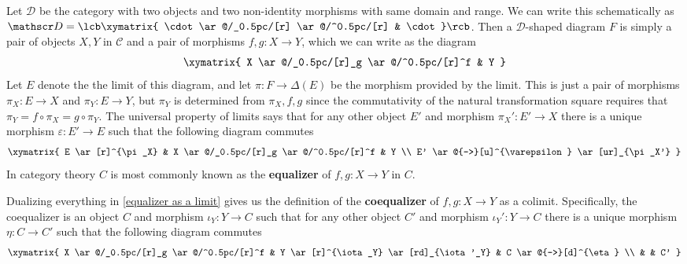 \begin{example}[Equalizers]
\label{equalizer as a limit}
Let $\mathscr D$ be the category with two objects and two non-identity morphisms with same domain and range. We can write this schematically as $\mathscr D = \lcb \xymatrix{ \cdot \ar@/_0.5pc/[r] \ar@/^0.5pc/[r] & \cdot } \rcb$. Then a $\mathscr D$-shaped diagram $F$ is simply a pair of objects $X,Y$ in $\mathscr C$ and a pair of morphisms $f,g : X \rightarrow Y$, which we can write as the diagram
\[
\xymatrix
{
	X \ar@/_0.5pc/[r]_g \ar@/^0.5pc/[r]^f & Y
}
\]
Let $E$ denote the the limit of this diagram, and let $\pi : F \rightarrow \Delta(E)$ be the morphism provided by the limit. This is just a pair of morphisms $\pi_X : E \rightarrow X$ and $\pi_Y : E \rightarrow Y$, but $\pi_Y$ is determined from $\pi_X,f,g$ since the commutativity of the natural transformation square requires that $\pi_Y = f \circ \pi_X = g \circ \pi_Y$. The universal property of limits says that for any other object $E'$ and morphism $\pi_X' : E' \rightarrow X$ there is a unique morphism $\varepsilon : E' \rightarrow E$ such that the following diagram commutes
\[
\xymatrix
{
	E \ar[r]^{\pi_X} & X \ar@/_0.5pc/[r]_g \ar@/^0.5pc/[r]^f & Y \\
	E' \ar@{-->}[u]^{\varepsilon} \ar[ur]_{\pi_X'}
}
\]
In category theory $C$ is most commonly known as the \textbf{equalizer} of $f,g : X \rightarrow Y$ in $C$.
\end{example}

\begin{example}[Coequalizers]
Dualizing everything in \cref{equalizer as a limit} gives us the definition of the \textbf{coequalizer} of $f,g : X \rightarrow Y$ as a colimit. Specifically, the coequalizer is an object $C$ and morphism $\iota_Y : Y \rightarrow C$ such that for any other object $C'$ and morphism $\iota_Y' : Y \rightarrow C$ there is a unique morphism $\eta : C \rightarrow C'$ such that the following diagram commutes
\[
\xymatrix
{
	X \ar@/_0.5pc/[r]_g \ar@/^0.5pc/[r]^f & Y \ar[r]^{\iota_Y} \ar[rd]_{\iota'_Y} & C \ar@{-->}[d]^{\eta} \\
	 & & C'
}
\]
\end{example}

